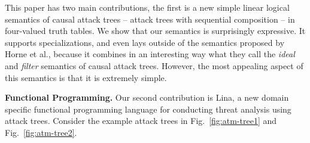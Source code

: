 This paper has two main contributions, the first is a new simple
linear logical semantics of causal attack trees -- attack trees with
sequential composition -- in four-valued truth tables.  We show that
our semantics is surprisingly expressive.  It supports
specializations, and even lays outside of the semantics proposed by
Horne et al.\cite{horne2017semantics}, because it combines in an
interesting way what they call the \emph{ideal} and \emph{filter}
semantics of causal attack trees.  However, the most appealing aspect
of this semantics is that it is extremely simple.

\textbf{Functional Programming.} Our second contribution is Lina, a
new domain specific functional programming language for conducting
threat analysis using attack trees.  Consider the example attack trees
in Fig.~\ref{fig:atm-tree1} and Fig.~\ref{fig:atm-tree2}.
